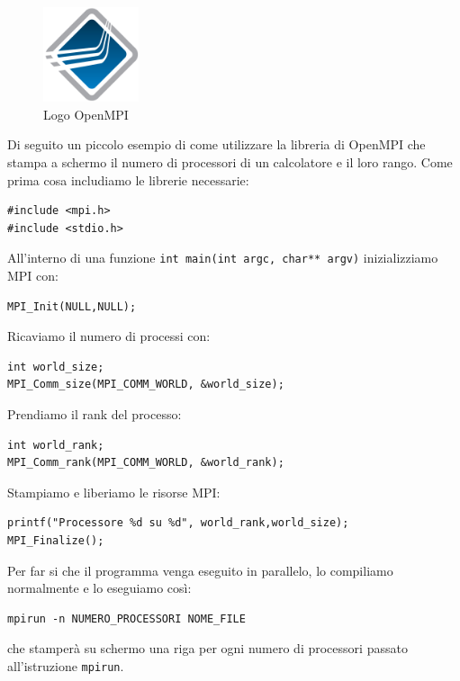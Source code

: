         \begin{figure}[H]
            \centering
            \includegraphics[width=0.25\textwidth]{figure/openmpi.png}
            \caption{Logo OpenMPI}
        \end{figure}
        Di seguito un piccolo esempio di come utilizzare la libreria di OpenMPI che stampa a schermo il numero di processori di un calcolatore e il loro rango.
        Come prima cosa includiamo le librerie necessarie:
        \begin{verbatim}
#include <mpi.h>
#include <stdio.h>
        \end{verbatim}
        All'interno di una funzione \texttt{int main(int argc, char** argv)} inizializziamo MPI con:
        \begin{verbatim}
MPI_Init(NULL,NULL);
        \end{verbatim}
        Ricaviamo il numero di processi con:
        \begin{verbatim}
int world_size;
MPI_Comm_size(MPI_COMM_WORLD, &world_size);
        \end{verbatim}
        Prendiamo il rank del processo:
        \begin{verbatim}
int world_rank;
MPI_Comm_rank(MPI_COMM_WORLD, &world_rank);
        \end{verbatim}
        Stampiamo e liberiamo le risorse MPI:
        \begin{verbatim}
printf("Processore %d su %d", world_rank,world_size);
MPI_Finalize();
        \end{verbatim}
        Per far si che il programma venga eseguito in parallelo, lo compiliamo normalmente e lo eseguiamo così:
        \begin{verbatim}
mpirun -n NUMERO_PROCESSORI NOME_FILE
        \end{verbatim}
        che stamperà su schermo una riga per ogni numero di processori passato all'istruzione \texttt{mpirun}.
